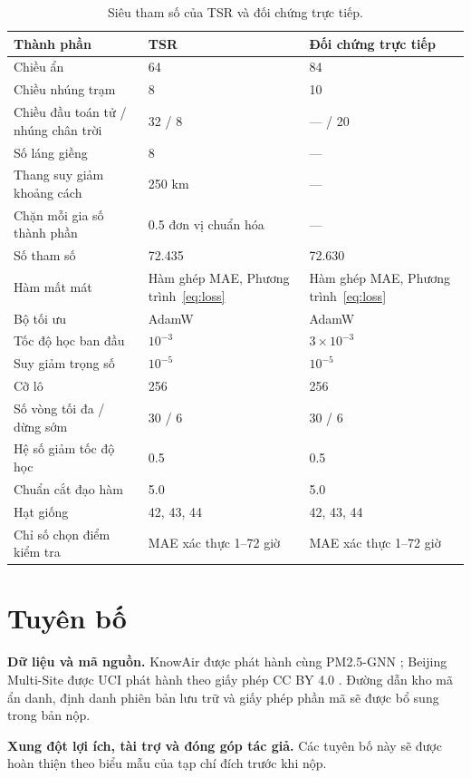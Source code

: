 \documentclass[10pt,a4paper]{article}
\newcommand{\modelname}{TSR}
\begin{document}
\begin{table}[h]
  \centering
  \caption{Siêu tham số của \modelname{} và đối chứng trực tiếp.}
  \label{tab:hyperparameters}
  \begin{tabular}{@{}lll@{}}
    \toprule
    Thành phần & \modelname{} & Đối chứng trực tiếp \\
    \midrule
    Chiều ẩn & 64 & 84 \\
    Chiều nhúng trạm & 8 & 10 \\
    Chiều đầu toán tử / nhúng chân trời & 32 / 8 & --- / 20 \\
    Số láng giềng & 8 & --- \\
    Thang suy giảm khoảng cách & 250 km & --- \\
    Chặn mỗi gia số thành phần & 0.5 đơn vị chuẩn hóa & --- \\
    Số tham số & 72.435 & 72.630 \\
    Hàm mất mát & Hàm ghép MAE, Phương trình~\eqref{eq:loss} & Hàm ghép MAE, Phương trình~\eqref{eq:loss} \\
    Bộ tối ưu & AdamW & AdamW \\
    Tốc độ học ban đầu & $10^{-3}$ & $3\times10^{-3}$ \\
    Suy giảm trọng số & $10^{-5}$ & $10^{-5}$ \\
    Cỡ lô & 256 & 256 \\
    Số vòng tối đa / dừng sớm & 30 / 6 & 30 / 6 \\
    Hệ số giảm tốc độ học & 0.5 & 0.5 \\
    Chuẩn cắt đạo hàm & 5.0 & 5.0 \\
    Hạt giống & 42, 43, 44 & 42, 43, 44 \\
    Chỉ số chọn điểm kiểm tra & MAE xác thực 1--72 giờ & MAE xác thực 1--72 giờ \\
    \bottomrule
  \end{tabular}
\end{table}

\section*{Tuyên bố}

\noindent\textbf{Dữ liệu và mã nguồn.}
KnowAir được phát hành cùng PM2.5-GNN \citep{wang2020pm25gnn}; Beijing Multi-Site được UCI phát hành theo giấy phép CC BY 4.0 \citep{chen2017beijing}. Đường dẫn kho mã ẩn danh, định danh phiên bản lưu trữ và giấy phép phần mã sẽ được bổ sung trong bản nộp.

\noindent\textbf{Xung đột lợi ích, tài trợ và đóng góp tác giả.}
Các tuyên bố này sẽ được hoàn thiện theo biểu mẫu của tạp chí đích trước khi nộp.

\FloatBarrier


\end{document}
